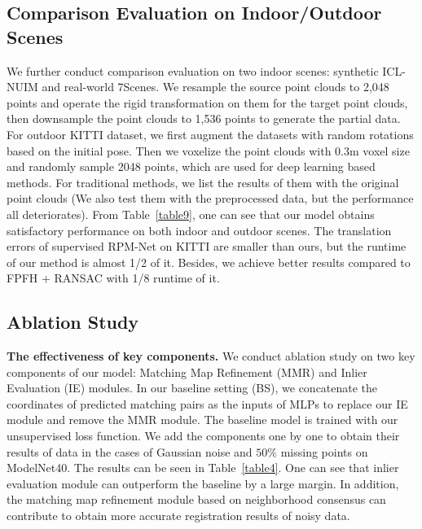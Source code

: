 \documentclass[letterpaper]{article} %
\begin{document}
	\subsection{Comparison Evaluation on Indoor/Outdoor Scenes}
	We further conduct comparison evaluation on two indoor scenes: synthetic ICL-NUIM and real-world 7Scenes. We resample the source point clouds to 2,048 points and operate the rigid transformation on them for the target point clouds, then downsample the point clouds to 1,536 points to generate the partial data. For outdoor KITTI dataset, we first augment the datasets with random rotations based on the initial pose. Then we voxelize the point clouds with 0.3m voxel size and randomly sample 2048 points, which are used for deep learning based methods. For traditional methods, we list the results of them with the original point clouds (We also test them with the preprocessed data, but the performance all deteriorates). From Table~\ref{table9}, one can see that our model obtains satisfactory performance on both indoor and outdoor scenes. The translation errors of supervised RPM-Net on KITTI are smaller than ours, but the runtime of our method is almost 1/2 of it. Besides, we achieve better results compared to FPFH + RANSAC with 1/8 runtime of it.
	
	\subsection{Ablation Study}\label{ablation}
	\noindent \textbf {The effectiveness of key components.}
	We conduct ablation study on two key components of our model: Matching Map Refinement (MMR) and Inlier Evaluation (IE) modules. In our baseline setting (BS), we concatenate the coordinates of predicted matching pairs as the inputs of MLPs to replace our IE module and remove the MMR module. The baseline model is trained with our unsupervised loss function. We add the components one by one to obtain their results of data in the cases of Gaussian noise and $50\%$ missing points on ModelNet40. The results can be seen in Table~\ref{table4}. One can see that inlier evaluation module can outperform the baseline by a large margin. In addition, the matching map refinement module based on neighborhood consensus can contribute to obtain more accurate registration results of noisy data.
	
\end{document}
